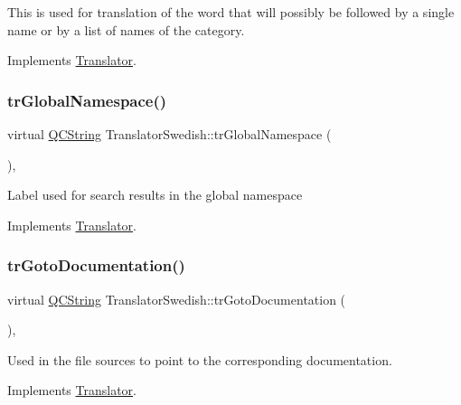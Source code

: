 This is used for translation of the word that will possibly be followed by a single name or by a list of names of the category. 

Implements \mbox{\hyperlink{class_translator}{Translator}}.

\mbox{\label{class_translator_swedish_a492b4706e2e93c26abf5fcccf6149a26}} 
\subsubsection{\texorpdfstring{trGlobalNamespace()}{trGlobalNamespace()}}
{\footnotesize\ttfamily virtual \mbox{\hyperlink{class_q_c_string}{Q\+C\+String}} Translator\+Swedish\+::tr\+Global\+Namespace (\begin{DoxyParamCaption}{ }\end{DoxyParamCaption})\hspace{0.3cm}{\ttfamily [inline]}, {\ttfamily [virtual]}}

Label used for search results in the global namespace 

Implements \mbox{\hyperlink{class_translator}{Translator}}.

\mbox{\label{class_translator_swedish_a5ee40ceac86b1cc02d26dab7c58489bf}} 
\subsubsection{\texorpdfstring{trGotoDocumentation()}{trGotoDocumentation()}}
{\footnotesize\ttfamily virtual \mbox{\hyperlink{class_q_c_string}{Q\+C\+String}} Translator\+Swedish\+::tr\+Goto\+Documentation (\begin{DoxyParamCaption}{ }\end{DoxyParamCaption})\hspace{0.3cm}{\ttfamily [inline]}, {\ttfamily [virtual]}}

Used in the file sources to point to the corresponding documentation. 

Implements \mbox{\hyperlink{class_translator}{Translator}}.

\mbox{\label{class_translator_swedish_ab72c306078a37ed67b3e746eeb17cef8}} 

